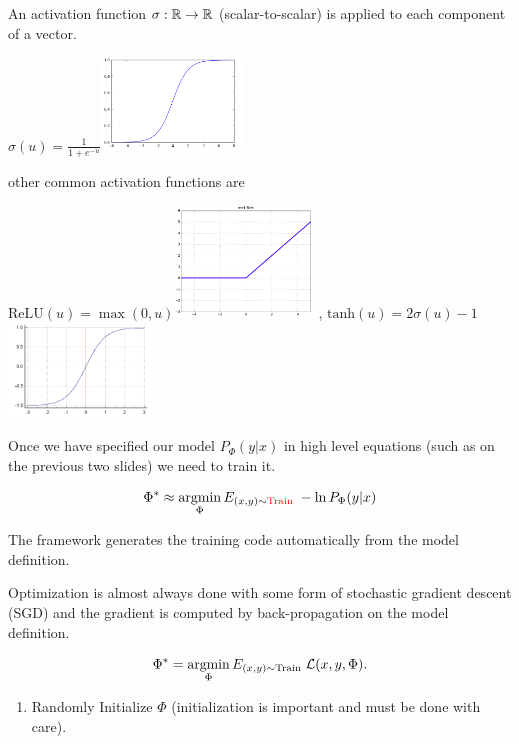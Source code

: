 {An activation function $\sigma:\mathbb{R} \rightarrow \mathbb{R}$ (scalar-to-scalar) is applied to each component of a vector.

\vfill
\centerline{{\color{red} $\sigma(u) = \frac{1}{1+e^{-u}}$}\hspace{3em}\includegraphics[width=1.5in]{../images/sigmoid}}

\vfill
other common activation functions are

\vfill
\centerline{{\color{red} $\mathrm{ReLU}(u) = \max(0,u)$}\includegraphics[width=1.5in]{../images/relu},
{\color{red} $\mathrm{tanh}(u) = 2\sigma(u)-1$}\includegraphics[width=1.5in]{../images/tanh}}


Once we have specified our model $P_\Phi(y|x)$ in high level equations (such as on the previous two slides) we need to train it.

$$\Phi^* \approx \operatorname*{argmin}_\Phi E_{(x,y) \sim {\color{red} \mathrm{Train}}} \; - \ln P_\Phi(y|x)$$

\vfill
The framework generates the training code automatically from the model definition.

\vfill
{\color{red} Optimization is almost always done with some form of stochastic gradient descent (SGD) and the gradient is computed
by back-propagation on the model definition.}

$$\Phi^* = \operatorname*{argmin}_\Phi E_{(x,y) \sim \mathrm{Train}} \; {\cal L}(x,y,\Phi).$$

\vfill
\begin{enumerate}
\item Randomly Initialize $\Phi$ (initialization is important and must be done with care).


\end{enumerate}}
